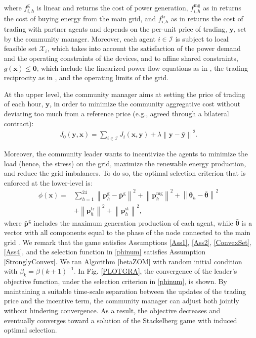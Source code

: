 \documentclass[letterpaper, 10 pt, conference]{ieeeconf}
\newcommand\pbf{\mathbf{p}}
\newcommand\xbf{\mathbf{x}}
\newcommand\ybf{\mathbf{y}}
\begin{document}
where $f_{i,h}^\mathrm{g}$ is linear and returns the cost of power generation, $f_{i,h}^\mathrm{mg}$ as in \cite[Eq. (11)]{9732452} returns the cost of buying energy from the main grid, and $f_{i,h}^\mathrm{tr}$ as in \cite[Eq. (7)]{9732452} returns the cost of trading with partner agents and depends on the per-unit price of trading, $\ybf$, set by the community manager. Moreover, each agent $i \in \mathcal{I}$ is subject to local feasible set $\mathcal{X}_i$, which takes into account the satisfaction of the power demand and the operating constraints of the devices, and to affine shared constraints, $g(\xbf)\le \mathbf{0}$, which include the linearized power flow equations as in \cite[Section VI]{benenatix2023optimal}, the trading reciprocity as in \cite[Eq. (8)]{9732452}, and the operating limits of the grid. 

At the upper level, the community manager aims at setting the price of trading of each hour, $\ybf$, in order to minimize the community aggregative cost without deviating too much from a reference price (e.g., agreed through a bilateral contract):
\begin{align*}
    J_0(\ybf, \xbf) = \sum_{i\in \mathcal{I}} J_i(\xbf, \ybf)+\lambda \left\|\ybf-\bar{\ybf}\right\|^2.
\end{align*}

Moreover, the community leader wants to incentivize the agents to minimize the load (hence, the stress) on the grid, maximize the renewable energy production, and reduce the grid imbalances. To do so, the optimal selection criterion that is enforced at the lower-level is:
\begin{equation}\label{phinum}
\begin{aligned}
    \phi(\xbf)=&\sum_{h=1}^{24} \left\|\pbf_h^\mathrm{g}-\bar{\pbf}^\mathrm{g}\right\|^2+\left\|\pbf_h^\mathrm{mg}\right\|^2+\left\|\mathbf{\theta}_h-\bar{\mathbf{\theta}}\right\|^2\\&+\left\|\pbf_h^\mathrm{tr}\right\|^2+\left\|\pbf_h^\mathrm{st}\right\|^2,
\end{aligned}
\end{equation}
where $\bar{\pbf}^\mathrm{g}$ includes the maximum generation production of each agent, while $\bar{\mathbf{\theta}}$ is a vector with all components equal to the phase of the node connected to the main grid \cite{benenatix2023optimal}. We remark that the game satisfies Assumptions \ref{Ass1}, \ref{Ass2}, \ref{ConvexSet}, \ref{Ass4}, and the selection function in \eqref{phinum} satisfies Assumption \ref{StronglyConvex}.
We ran Algorithm \ref{betaZOM} with random initial condition with $\beta_k=\bar{\beta} (k+1)^{-1}$. In Fig. \ref{PLOTGRA}, the convergence of the leader's objective function, under the selection criterion in \eqref{phinum}, is shown. By maintaining a suitable time-scale separation between the updates of the trading price and the incentive term, the community manager can adjust both jointly without hindering convergence. As a result, the objective decreases and eventually converges toward a solution of the Stackelberg game with induced optimal selection.
\end{document}
